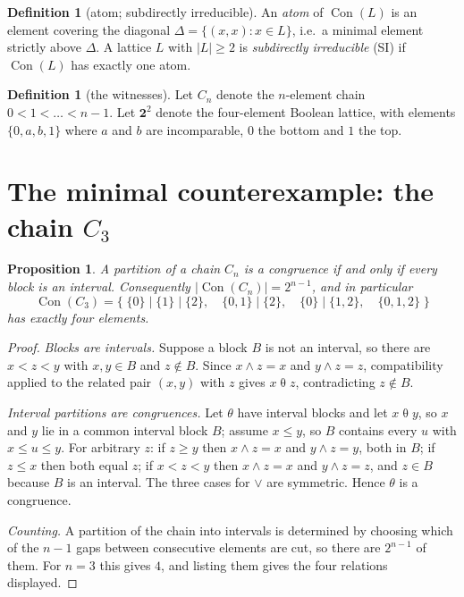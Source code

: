 \documentclass[11pt]{article}
\newtheorem{proposition}[theorem]{Proposition}
\theoremstyle{definition}
\newtheorem{definition}[theorem]{Definition}
\newcommand{\Con}{\operatorname{Con}}
\begin{document}
\begin{definition}[atom; subdirectly irreducible]
An \emph{atom} of $\Con(L)$ is an element covering the diagonal
$\Delta = \{(x,x) : x \in L\}$, i.e.\ a minimal element strictly above
$\Delta$. A lattice $L$ with $|L| \ge 2$ is \emph{subdirectly irreducible}
(SI) if $\Con(L)$ has exactly one atom.
\end{definition}

\begin{definition}[the witnesses]\label{def:witnesses}
Let $C_n$ denote the $n$-element chain $0 < 1 < \dots < n-1$. Let
$\mathbf{2}^2$ denote the four-element Boolean lattice, with elements
$\{0, a, b, 1\}$ where $a$ and $b$ are incomparable, $0$ the bottom and $1$
the top.
\end{definition}

\section{The minimal counterexample: the chain \texorpdfstring{$C_3$}{C3}}

\begin{proposition}\label{prop:chain-con}
A partition of a chain $C_n$ is a congruence if and only if every block is an
interval. Consequently $|\Con(C_n)| = 2^{n-1}$, and in particular
\[
\Con(C_3) = \bigl\{\;\{0\}\!\mid\!\{1\}\!\mid\!\{2\},\quad
\{0,1\}\!\mid\!\{2\},\quad
\{0\}\!\mid\!\{1,2\},\quad
\{0,1,2\}\;\bigr\}
\]
has exactly four elements.
\end{proposition}

\begin{proof}
\emph{Blocks are intervals.} Suppose a block $B$ is not an interval, so there
are $x < z < y$ with $x, y \in B$ and $z \notin B$. Since $x \wedge z = x$ and
$y \wedge z = z$, compatibility applied to the related pair $(x,y)$ with
$z$ gives $x \mathrel{\theta} z$, contradicting $z \notin B$.

\emph{Interval partitions are congruences.} Let $\theta$ have interval blocks
and let $x \mathrel{\theta} y$, so $x$ and $y$ lie in a common interval block
$B$; assume $x \le y$, so $B$ contains every $u$ with $x \le u \le y$. For
arbitrary $z$: if $z \ge y$ then $x \wedge z = x$ and $y \wedge z = y$, both in
$B$; if $z \le x$ then both equal $z$; if $x < z < y$ then $x \wedge z = x$ and
$y \wedge z = z$, and $z \in B$ because $B$ is an interval. The three cases for
$\vee$ are symmetric. Hence $\theta$ is a congruence.

\emph{Counting.} A partition of the chain into intervals is determined by
choosing which of the $n-1$ gaps between consecutive elements are cut, so
there are $2^{n-1}$ of them. For $n = 3$ this gives $4$, and listing them
gives the four relations displayed.
\end{proof}
\end{document}
